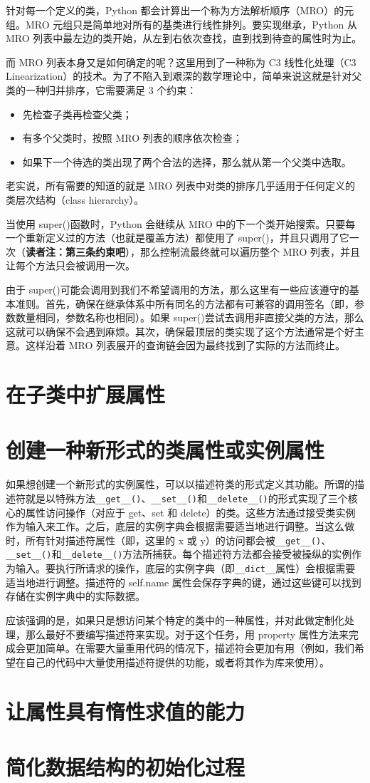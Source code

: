 针对每一个定义的类，Python 都会计算出一个称为方法解析顺序（MRO）的元组。MRO 元组只是简单地对所有的基类进行线性排列。要实现继承，Python 从 MRO 列表中最左边的类开始，从左到右依次查找，直到找到待查的属性时为止。

而 MRO 列表本身又是如何确定的呢？这里用到了一种称为 C3 线性化处理（C3 Linearization）的技术。为了不陷入到艰深的数学理论中，简单来说这就是针对父类的一种归并排序，它需要满足 3 个约束：
\begin{itemize}
    \item 先检查子类再检查父类；
    \item 有多个父类时，按照 MRO 列表的顺序依次检查；
    \item 如果下一个待选的类出现了两个合法的选择，那么就从第一个父类中选取。
\end{itemize}
老实说，所有需要的知道的就是 MRO 列表中对类的排序几乎适用于任何定义的类层次结构（class hierarchy）。

当使用 super()函数时，Python 会继续从 MRO 中的下一个类开始搜索。只要每一个重新定义过的方法（也就是覆盖方法）都使用了 super()，并且只调用了它一次（\textbf{读者注：第三条约束吧}），那么控制流最终就可以遍历整个 MRO 列表，并且让每个方法只会被调用一次。

由于 super()可能会调用到我们不希望调用的方法，那么这里有一些应该遵守的基本准则。首先，确保在继承体系中所有同名的方法都有可兼容的调用签名（即，参数数量相同，参数名称也相同）。如果 super()尝试去调用非直接父类的方法，那么这就可以确保不会遇到麻烦。其次，确保最顶层的类实现了这个方法通常是个好主意。这样沿着 MRO 列表展开的查询链会因为最终找到了实际的方法而终止。
\section{在子类中扩展属性}
\section{创建一种新形式的类属性或实例属性}
如果想创建一个新形式的实例属性，可以以描述符类的形式定义其功能。所谓的描述符就是以特殊方法\verb|__get__()|、\verb|__set__()|和\verb|__delete__()|的形式实现了三个核心的属性访问操作（对应于 get、set 和 delete）的类。这些方法通过接受类实例作为输入来工作。之后，底层的实例字典会根据需要适当地进行调整。当这么做时，所有针对描述符属性（即，这里的 x 或 y）的访问都会被\verb|__get__()|、\verb|__set__()|和\verb|__delete__()|方法所捕获。每个描述符方法都会接受被操纵的实例作为输入。要执行所请求的操作，底层的实例字典（即\verb|__dict__|属性）会根据需要适当地进行调整。描述符的 self.name 属性会保存字典的键，通过这些键可以找到存储在实例字典中的实际数据。

应该强调的是，如果只是想访问某个特定的类中的一种属性，并对此做定制化处理，那么最好不要编写描述符来实现。对于这个任务，用 property 属性方法来完成会更加简单。在需要大量重用代码的情况下，描述符会更加有用（例如，我们希望在自己的代码中大量使用描述符提供的功能，或者将其作为库来使用）。
\section{让属性具有惰性求值的能力}
\section{简化数据结构的初始化过程}
